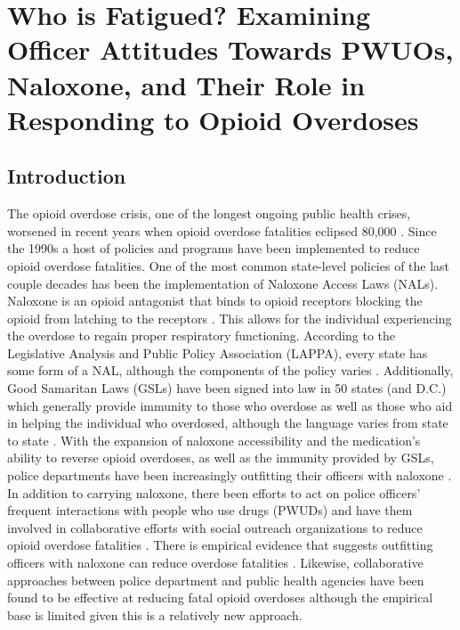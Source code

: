 \chapter{Who is Fatigued? Examining Officer Attitudes Towards PWUOs, Naloxone, and Their Role in Responding to Opioid Overdoses}

\section{Introduction}

The opioid overdose crisis, one of the longest ongoing public health crises, worsened in recent years when opioid overdose fatalities eclipsed 80,000 \parencite{center_for_disease_control_and_prevention_national_2023}. Since the 1990s a host of policies and programs have been implemented to reduce opioid overdose fatalities. One of the most common state-level policies of the last couple decades has been the implementation of Naloxone Access Laws (NALs). Naloxone is an opioid antagonist that binds to opioid receptors blocking the opioid from latching to the receptors \parencite{lurigio_opioid_2018}. This allows for the individual experiencing the overdose to regain proper respiratory functioning. According to the Legislative Analysis and Public Policy Association (LAPPA), every state has some form of a NAL, although the components of the policy varies \parencite{legislative_analysis_and_public_policy_association_naloxone_2022}. Additionally, Good Samaritan Laws (GSLs) have been signed into law in 50 states (and D.C.) which generally provide immunity to those who overdose as well as those who aid in helping the individual who overdosed, although the language varies from state to state \parencite{west_good_2023}. With the expansion of naloxone accessibility and the medication's ability to reverse opioid overdoses, as well as the immunity provided by GSLs, police departments have been increasingly outfitting their officers with naloxone \parencite{lurigio_opioid_2018}. In addition to carrying naloxone, there been efforts to act on police officers' frequent interactions with people who use drugs (PWUDs) and have them involved in collaborative efforts with social outreach organizations to reduce opioid overdose fatalities \parencite{donnelly_law_2022, formica_characteristics_2021, yatsco_alternatives_2020}. There is empirical evidence that suggests outfitting officers with naloxone can reduce overdose fatalities \parencite{rando_intranasal_2015}. Likewise, collaborative approaches between police department and public health agencies have been found to be effective at reducing fatal opioid overdoses \parencite{donnelly_law_2022} although the empirical base is limited given this is a relatively new approach.

